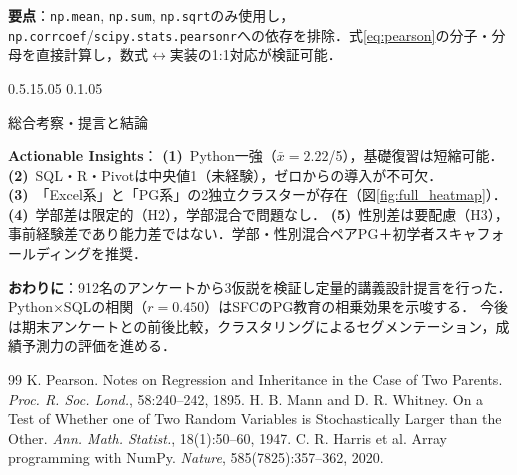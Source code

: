 \documentclass[uplatex, dvipdfmx, a4paper, 10pt]{jsarticle}
\makeatletter
\renewcommand{\section}{\@startsection{section}{1}{\z@}%
  {0.5\Cvs \@plus.15\Cvs \@minus.05\Cvs}%
  {0.1\Cvs \@plus.05\Cvs}%
  {\normalfont\large\headfont\raggedright}}
\makeatother
\begin{document}
\vspace{-1mm}
\noindent\textbf{要点}：\texttt{np.mean}, \texttt{np.sum}, \texttt{np.sqrt}のみ使用し，\texttt{np.corrcoef}/\texttt{scipy.stats.pearsonr}への依存を排除．式\eqref{eq:pearson}の分子・分母を直接計算し，数式$\leftrightarrow$実装の1:1対応が検証可能．

\section{総合考察・提言と結論}

\vspace{-1mm}
\noindent\textbf{Actionable Insights}：
\textbf{(1)}~Python一強（$\bar{x}\!=\!2.22$/5），基礎復習は短縮可能．
\textbf{(2)}~SQL・R・Pivotは中央値1（未経験），ゼロからの導入が不可欠．
\textbf{(3)}~「Excel系」と「PG系」の2独立クラスターが存在（図\ref{fig:full_heatmap}）．
\textbf{(4)}~学部差は限定的（H2），学部混合で問題なし．
\textbf{(5)}~性別差は要配慮（H3），事前経験差であり能力差ではない．学部・性別混合ペアPG＋初学者スキャフォールディングを推奨．

\vspace{1mm}
\noindent\textbf{おわりに}：912名のアンケートから3仮説を検証し定量的講義設計提言を行った．
Python$\times$SQLの相関（$r\!=\!0.450$）はSFCのPG教育の相乗効果を示唆する．
今後は期末アンケートとの前後比較，クラスタリングによるセグメンテーション，成績予測力の評価を進める．

\vspace{-1mm}
\begin{thebibliography}{99}\footnotesize
     K. Pearson. Notes on Regression and Inheritance in the Case of Two Parents. \textit{Proc. R. Soc. Lond.}, 58:240--242, 1895.
     H. B. Mann and D. R. Whitney. On a Test of Whether one of Two Random Variables is Stochastically Larger than the Other. \textit{Ann. Math. Statist.}, 18(1):50--60, 1947.
     C. R. Harris et al. Array programming with NumPy. \textit{Nature}, 585(7825):357--362, 2020.
\end{thebibliography}
\end{document}
